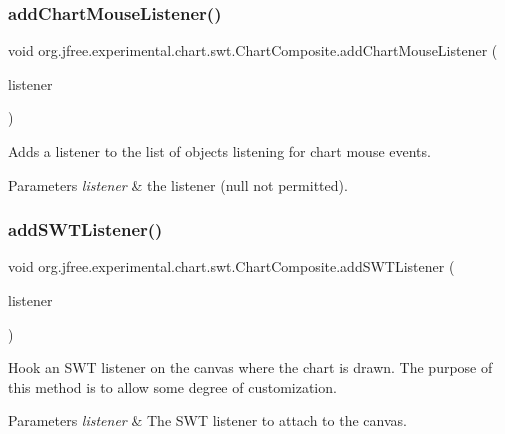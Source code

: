 \subsubsection{\texorpdfstring{add\+Chart\+Mouse\+Listener()}{addChartMouseListener()}}
{\footnotesize\ttfamily void org.\+jfree.\+experimental.\+chart.\+swt.\+Chart\+Composite.\+add\+Chart\+Mouse\+Listener (\begin{DoxyParamCaption}\item[{\mbox{\hyperlink{interfaceorg_1_1jfree_1_1chart_1_1_chart_mouse_listener}{Chart\+Mouse\+Listener}}}]{listener }\end{DoxyParamCaption})}

Adds a listener to the list of objects listening for chart mouse events.


\begin{DoxyParams}{Parameters}
{\em listener} & the listener ({\ttfamily null} not permitted). \\
\hline
\end{DoxyParams}
\mbox{\label{classorg_1_1jfree_1_1experimental_1_1chart_1_1swt_1_1_chart_composite_a1882454eb89cffce02813f900386c687}} 
\subsubsection{\texorpdfstring{add\+S\+W\+T\+Listener()}{addSWTListener()}}
{\footnotesize\ttfamily void org.\+jfree.\+experimental.\+chart.\+swt.\+Chart\+Composite.\+add\+S\+W\+T\+Listener (\begin{DoxyParamCaption}\item[{Event\+Listener}]{listener }\end{DoxyParamCaption})}

Hook an S\+WT listener on the canvas where the chart is drawn. The purpose of this method is to allow some degree of customization.


\begin{DoxyParams}{Parameters}
{\em listener} & The S\+WT listener to attach to the canvas. \\
\hline
\end{DoxyParams}
\mbox{\label{classorg_1_1jfree_1_1experimental_1_1chart_1_1swt_1_1_chart_composite_a356b3e52ea0215e75ea2d9a248fd25ee}} 

